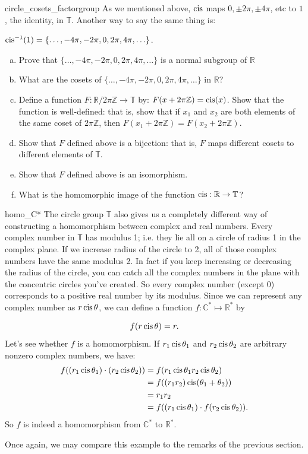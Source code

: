 \begin{exercise}{circle_cosets_factorgroup}
As we mentioned above, $\operatorname{cis}$ maps $0, \pm 2\pi, \pm 4\pi$, etc to $1$, the identity, in ${ \mathbb T}$. Another way to say the same thing is:

$\operatorname{cis}^{-1}(1) = \{ \ldots , -4\pi, -2\pi, 0, 2\pi, 4\pi, \ldots \}$.

\begin{enumerate}[(a)]
\item
Prove that $\{ \ldots , -4\pi, -2\pi, 0, 2\pi, 4\pi, \ldots \}$ is a normal subgroup of ${ \mathbb R}$
\item
What are the cosets of $\{ \ldots , -4\pi, -2\pi, 0, 2\pi, 4\pi, \ldots \}$ in ${ \mathbb R}$?
\item
Define a function $F:{ \mathbb R} / 2\pi { \mathbb Z} \rightarrow { \mathbb T}$ by:  $F(x + 2\pi\mathbb{Z}) = \operatorname{cis}(x)$. Show that the function is well-defined:  that is, show that if  $x_1$ and $x_2$ are both elements of the same coset of $2\pi\mathbb{Z}$, then $F(x_1+2\pi\mathbb{Z}) = F(x_2+2\pi\mathbb{Z})$.
\item
Show that $F$ defined above is a bijection: that is, $F$ maps different cosets to different elements of $\mathbb{T}$.
\item
Show that $F$ defined above is an isomorphism.
\item
What is the homomorphic image of the function $\operatorname{cis}: \mathbb{R} \rightarrow \mathbb{T}$?
\end{enumerate}
\end{exercise} 

\begin{example}{homo_C*}
The circle group ${ \mathbb T}$ also gives us a completely different way of constructing a homomorphism between complex and real numbers.  Every complex number in ${ \mathbb T}$ has modulus 1; i.e. they lie all on a circle of radius 1 in the complex plane.  If we increase radius of the circle to 2, all of those complex numbers have the same modulus 2.  In fact if you keep increasing or decreasing the radius of the circle, you can catch all the complex numbers in the plane with the concentric circles you've created.  So every complex number (except 0) corresponds to a positive real number by its modulus. Since we can represent any complex number as $r \operatorname{cis} \theta$, we can define a function
$f:  {\mathbb C}^\ast \mapsto  {\mathbb R}^\ast$ by

\[
f(r \operatorname{cis} \theta) = r.
\]
Let's see whether $f$ is a homomorphism. If $r_1 \operatorname{cis} \theta_1$ and $r_2 \operatorname{cis} \theta_2$ are arbitrary nonzero complex numbers, we have:
\begin{align*}
f((r_1\operatorname{cis} \theta_1)\cdot (r_2\operatorname{cis} \theta_2)) &= f(r_1 \operatorname{cis} \theta_1 r_2 \operatorname{cis} \theta_2)\\
&= f((r_1 r_2)\operatorname{cis} (\theta_1+ \theta_2))\\
&= r_1 r_2 \\
&= f((r_1\operatorname{cis} \theta_1)\cdot f(r_2\operatorname{cis} \theta_2)).
\end{align*}
So $f$ is indeed a homomorphism from ${\mathbb C}^\ast$ to ${\mathbb R}^\ast$.
\end{example}
Once again, we may compare this example to the remarks of the previous section.

